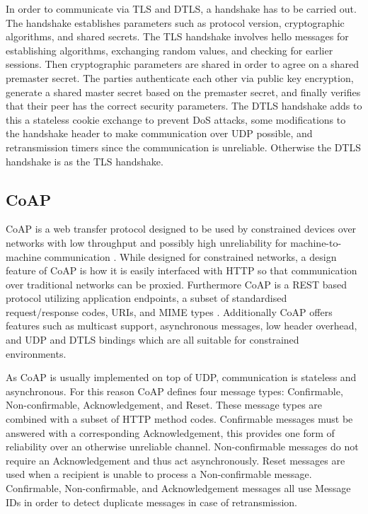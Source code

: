 \documentclass[0-thesis.tex]{subfiles}
\begin{document}
In order to communicate via TLS and DTLS, a handshake has to be carried out. The handshake 
establishes parameters such as protocol version, cryptographic algorithms, and shared 
secrets. The TLS handshake involves hello messages for establishing algorithms, exchanging 
random values, and checking for earlier sessions. Then cryptographic parameters are shared in 
order to agree on a shared premaster secret. The parties authenticate each other via public 
key encryption, generate a shared master secret based on the premaster secret, and finally 
verifies that their peer has the correct security parameters. The DTLS handshake adds to this 
a stateless cookie exchange to prevent DoS attacks, some modifications to the handshake 
header to make communication over UDP possible, and retransmission timers since the communication 
is unreliable. Otherwise the DTLS handshake is as the TLS handshake.

\subsection{CoAP}
CoAP is a web transfer protocol designed to be used by constrained devices over networks with 
low throughput and possibly high unreliability for machine-to-machine communication 
\parencite{rfc7252}. While designed for constrained networks, a design feature of CoAP is 
how it is easily interfaced with HTTP so that communication over traditional networks can be 
proxied. Furthermore CoAP is a REST based protocol utilizing application endpoints, a subset 
of standardised request/response codes, URIs, and MIME types \parencite{rest}. Additionally 
CoAP offers features such as multicast support, asynchronous messages, low header overhead, 
and UDP and DTLS bindings which are all suitable for constrained environments.

As CoAP is usually implemented on top of UDP, communication is stateless and asynchronous. 
For this reason CoAP defines four message types: Confirmable, Non-confirmable, Acknowledgement,
and Reset. These message types are combined with a subset of HTTP method codes. Confirmable 
messages must be answered with a corresponding Acknowledgement, this provides one form of 
reliability over an otherwise unreliable channel. Non-confirmable messages do not require an 
Acknowledgement and thus act asynchronously. Reset messages are used when a recipient is 
unable to process a Non-confirmable message. Confirmable, Non-confirmable, and Acknowledgement
messages all use Message IDs in order to detect duplicate messages in case of retransmission.
\end{document}
